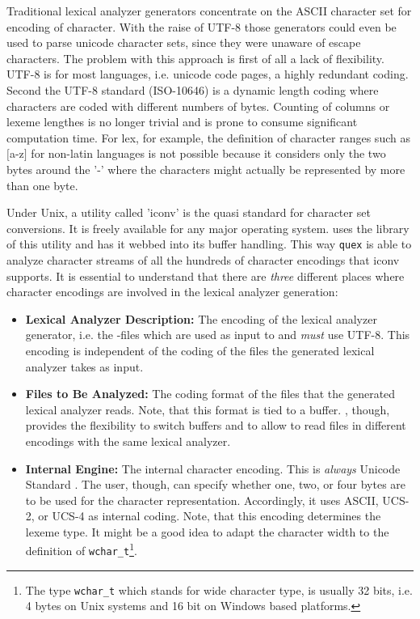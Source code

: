 Traditional lexical analyzer generators concentrate on the ASCII \cite{}
character set for encoding of character. With the raise of UTF-8 \cite{} those
generators could even be used to parse unicode character sets, since they were
unaware of escape characters.   The
problem with this approach is first of all a lack of flexibility.  UTF-8 is for
most languages, i.e. unicode code pages, a highly redundant coding. Second the
UTF-8 standard (ISO-10646) is a dynamic length coding where characters are
coded with different numbers of bytes.  Counting of columns or lexeme lengthes
is no longer trivial and is prone to consume significant computation time. 
For lex, for example, the definition of character ranges such as
$[$a-z$]$ for non-latin languages is not possible because it considers
only the two bytes around the '-' where the characters might actually be
represented by more than one byte.

Under Unix, a utility called 'iconv' \cite{} is the quasi standard for
character set conversions. It is freely available for any major operating
system.  {\Quex} uses the library of this utility and has it webbed into its
buffer handling. This way {\tt quex} is able to analyze character streams of
all the hundreds of character encodings that iconv supports. It is essential to
understand that there are {\it three} different places where character
encodings are involved in the lexical analyzer generation:

\begin{itemize}
    \item {\bf Lexical Analyzer Description:} The encoding of the lexical analyzer generator, i.e. the {\quex}-files
          which are used as input to {\quex} and {\it must} use UTF-8.
          This encoding is independent of the coding of the files the generated
          lexical analyzer takes as input.

    \item {\bf Files to Be Analyzed:} The coding
          format of the files that the generated lexical analyzer reads. Note, that
          this format is tied to a buffer. {\Quex}, though, provides the flexibility
          to switch buffers and to allow to read files in different encodings 
          with the same lexical analyzer.

    \item {\bf Internal Engine:} The internal character encoding. This is {\it always} Unicode Standard \cite{}. 
          The user, though, can specify whether one, two, or four bytes are to be used 
          for the character representation. Accordingly, it uses ASCII, UCS-2, or UCS-4
          as internal coding. Note, that this encoding determines the lexeme type. 
          It might be a good idea to adapt the character width to the definition of
          {\tt wchar\_t}\footnote{The type {\tt wchar_t} which stands for wide character type, is usually
          32 bits, i.e. 4 bytes on Unix systems and 16 bit on Windows based platforms.}. 
        
\end{itemize}

